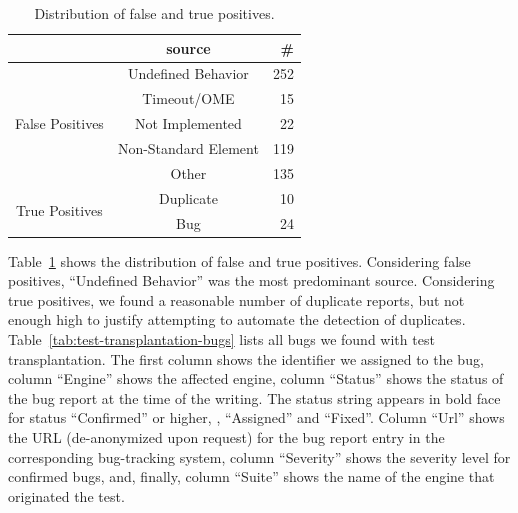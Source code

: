 \documentclass[10pt,conference,anonymous]{IEEEtran}
\begin{document}
\begin{table}[t!]
  \setlength{\tabcolsep}{4pt}    
  \centering
  \caption{\label{fig:falsepositives}\label{fig:truepositives}\label{fig:piecharts-transplantation}Distribution of false and true positives.}
  \begin{tabular}{ccr}
    \toprule
    & source &  \#\\
    \midrule
    \multirow{5}{*}{False Positives} & Undefined Behavior & 252 \\
    & Timeout/OME & 15 \\
    & Not Implemented & 22 \\
    & Non-Standard Element & 119 \\
    & Other & 135 \\
    \midrule
    \multirow{2}{*}{True Positives} & Duplicate & 10 \\
    & Bug & 24 \\
    \bottomrule
  \end{tabular}
\end{table}






Table~\ref{fig:piecharts-transplantation} shows the distribution of
false and true positives. Considering false positives, ``Undefined
Behavior'' was the most predominant source. Considering true
positives, we found a reasonable number of duplicate reports, but not
enough high to justify attempting to automate the detection of
duplicates.  Table~\ref{tab:test-transplantation-bugs} lists all bugs
we found with test transplantation. The first column shows the
identifier we assigned to the bug, column
``Engine'' shows the affected engine, column ``Status'' shows the
status of the bug report at the time of the writing. The status string
appears in bold face for status ``Confirmed'' or higher, \ie{},
``Assigned'' and ``Fixed''.  Column ``Url'' shows the URL
(de-anonymized upon request) for the bug report entry in the
corresponding bug-tracking system, column ``Severity'' shows the
severity level for confirmed bugs, and, finally, column ``Suite''
shows the name of the engine that originated the test.
\end{document}
